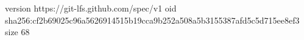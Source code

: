 version https://git-lfs.github.com/spec/v1
oid sha256:cf2b69025c96a5626914515b19cca9b252a508a5b3155387afd5c5d715ee8ef3
size 68
